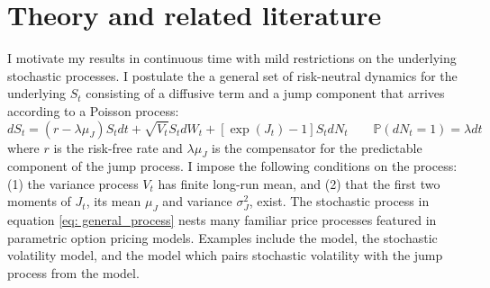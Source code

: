 \documentclass[12pt]{article}
\begin{document}
\section{Theory and related literature}\label{sec: theory}
I motivate my results in continuous time with mild restrictions on the underlying stochastic processes. I postulate the a general set of risk-neutral dynamics for the underlying $S_t$ consisting of a diffusive term and a jump component that arrives according to a Poisson process: 
\begin{equation}\label{eq: general_process}
d S_t=\left(r-\lambda \mu_J\right) S_t d t+\sqrt{V_t} S_t d W_t+\left[\exp(J_t)-1\right] S_t d N_t     \qquad  \mathbb{P}(dN_t = 1) = \lambda dt
\end{equation}
where $r$ is the risk-free rate and $\lambda \mu_J$ is the compensator for the predictable component of the jump process. I impose the following conditions on the process: (1) the variance process $V_t$ has finite long-run mean, and (2) that the first two moments of $J_t$, its mean $\mu_J$ and variance $\sigma_J^2$, exist. The stochastic process in equation \eqref{eq: general_process} nests many familiar price processes featured in parametric option pricing models. Examples include the \cite{black1973pricing} model, the \cite{hull1990pricing} stochastic volatility model, and the \cite{bates1996jumps} model which pairs stochastic volatility with the jump process from the \cite{merton1976option} model.
\end{document}
